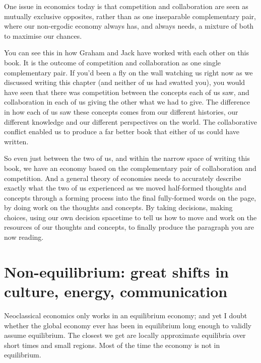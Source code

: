 One issue in economics today is that competition and collaboration are seen as mutually exclusive opposites, rather than as one inseparable complementary pair,  where our non-ergodic economy always has, and always needs, a mixture of both to maximise our chances.


\begin{longstoryblock}
You can see this in how Graham and Jack have worked with each other on this book. It is the outcome of competition and collaboration as one single complementary pair. If you'd been a fly on the wall watching us right now as we discussed writing this chapter (and neither of us had swatted you), you would have seen that there was competition between the concepts each of us saw, and collaboration in each of us giving the other what we had to give. The difference in how each of us saw these concepts comes from our different histories, our different knowledge and our different perspectives on the world. The collaborative conflict enabled us to produce a far better book that either of us could have written. 


So even just between the two of us, and within the narrow space of writing this book, we have an economy based on the complementary pair of collaboration and competition. And a general theory of economies needs to accurately describe exactly what the two of us experienced as we moved half-formed thoughts and concepts through a forming process into the final fully-formed words on the page, by doing work on the thoughts and concepts. By taking decisions, making choices, using our own decision spacetime to tell us how to move and work on the resources of our thoughts and concepts, to finally produce the paragraph you are now reading. 
\end{longstoryblock}




\section[Non-equilibrium: great shifts]{Non-equilibrium: great shifts in culture, energy, communication}
Neoclassical economics  only works in an equilibrium economy\cite{earl-econocracy}; and yet I doubt whether the global economy ever has been in equilibrium long enough to validly assume equilibrium. The closest we get are locally approximate equilibria over short times and small regions. Most of the time the economy is not in equilibrium.


